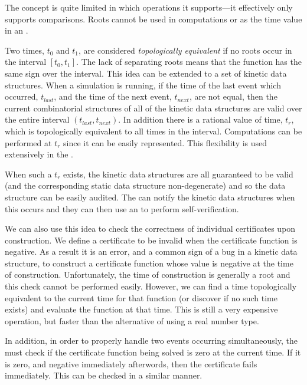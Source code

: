 The  concept is quite limited in which operations it
supports---it effectively only supports comparisons.  Roots cannot be
used in computations or as the time value in an
. 

Two times, $t_0$ and $t_1$, are considered \textit{topologically
equivalent} if no roots occur in the interval $[t_0,t_1]$. The lack of
separating roots means that the function has the same sign over the
interval. This idea can be extended to a set of kinetic data
structures. When a simulation is running, if the time of the last event
which occurred, $t_{last}$, and the time of the next event,
$t_{next}$, are not equal, then the current combinatorial structures of
all of the kinetic data structures are valid over the entire interval
$(t_{last},t_{next})$. In addition there is a rational value of time,
$t_r$, which is topologically equivalent to all times in the
interval. Computations can be performed at $t_r$ since it can be
easily represented. This flexibility is used extensively in the .

When such a $t_r$ exists, the kinetic data structures are all
guaranteed to be valid (and the corresponding static data structure
non-degenerate) and so the data structure can be easily audited. The  can
notify the kinetic data structures when this occurs and they can then
use an  to perform self-verification.

We can also use this idea to check the correctness of individual
certificates upon construction. We define a certificate to be invalid
when the certificate function is negative. As a result it
is an error, and a common sign of a bug in a kinetic data structure,
to construct a certificate function whose value is negative at the
time of construction. 
%
Unfortunately, the time of construction is
generally a root and this check cannot be performed easily. However,
we can find a time topologically equivalent to the current time for
that function (or discover if no such time exists) and evaluate the
function at that time. This is still a very expensive operation, but
faster than the alternative of using a real number type.

In addition, in order to properly handle two events occurring
simultaneously, the  must check if the certificate function
being solved is zero at the current time. If it is zero, and negative
immediately afterwords, then the certificate fails immediately. This
can be checked in a similar manner.


